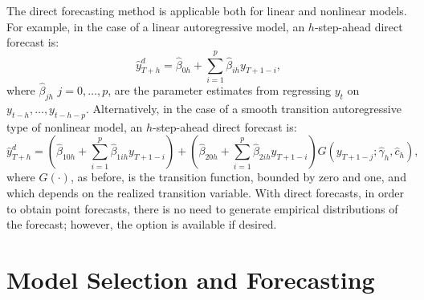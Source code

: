\documentclass[11pt]{article}
\begin{document}

The direct forecasting method is applicable both for linear and nonlinear models. For example, in the case of a linear autoregressive model, an $h$-step-ahead direct forecast is: 
\begin{equation}
\label{directar}
\hat{y}_{T+h}^d = \hat{\beta}_{0h}+\sum_{i=1}^{p}\hat{\beta}_{ih}y_{T+1-i},
\end{equation}
where $\hat{\beta}_{jh}$ $j=0,\ldots,p$, are the parameter estimates from regressing $y_t$ on $y_{t-h},\ldots,y_{t-h-p}$. Alternatively, in the case of a smooth transition autoregressive type of nonlinear model, an $h$-step-ahead direct forecast is:
\begin{equation}
\label{directstar}
\hat{y}_{T+h}^d = \left(\hat{\beta}_{10h}+\sum_{i=1}^{p}\hat{\beta}_{1ih}y_{T+1-i}\right)+ \left(\hat{\beta}_{20h}+\sum_{i=1}^{p}\hat{\beta}_{2ih}y_{T+1-i}\right)G\left(y_{T+1-j};\hat{\gamma}_h,\hat{c}_h\right),
\end{equation}
where $G\left(\cdot\right)$, as before, is the transition function, bounded by zero and one, and which depends on the realized transition variable. With direct forecasts, in order to obtain point forecasts, there is no need to generate empirical distributions of the forecast; however, the option is available if desired.


\section{Model Selection and Forecasting}
\end{document}
